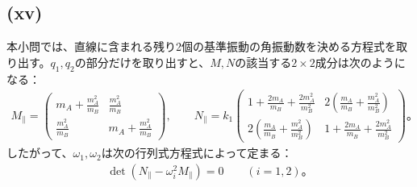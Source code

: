   \subsection*{(xv)}
  本小問では、直線に含まれる残り2個の基準振動の角振動数を決める方程式を取り出す。$q_1,q_2$の部分だけを取り出すと、$M,N$の該当する$2\times2$成分は次のようになる：
  \begin{align*}
    M_\parallel=
    \begin{pmatrix}
      m_A+\frac{m_A^2}{m_B} & \frac{m_A^2}{m_B} \\
      \frac{m_A^2}{m_B} & m_A+\frac{m_A^2}{m_B}
    \end{pmatrix},
  \qquad
    N_\parallel=
    k_1
    \begin{pmatrix}
      1+\frac{2m_A}{m_B}+\frac{2m_A^2}{m_B^2} & 2\left(\frac{m_A}{m_B}+\frac{m_A^2}{m_B^2}\right) \\
      2\left(\frac{m_A}{m_B}+\frac{m_A^2}{m_B^2}\right) & 1+\frac{2m_A}{m_B}+\frac{2m_A^2}{m_B^2}
    \end{pmatrix}。
  \end{align*}
  したがって、$\omega_1,\omega_2$は次の行列式方程式によって定まる：
  \begin{align*}
    \det(N_\parallel-\omega_i^2M_\parallel)=0\qquad(i=1,2)。\tag{144}
  \end{align*}
  
